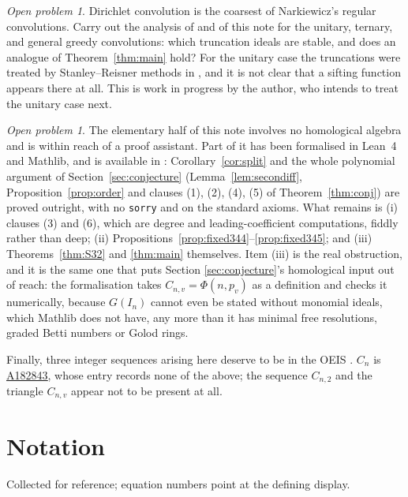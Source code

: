 \documentclass[a4paper,11pt,oneside,reqno]{amsart}
\theoremstyle{definition}
\theoremstyle{remark}
\newtheorem{openproblem}[definition]{Open problem}
\theoremstyle{plain}
\newcommand{\seqnum}[1]{\href{https://oeis.org/#1}{\underline{#1}}}
\begin{document}
\begin{openproblem}
  Dirichlet convolution is the coarsest of Narkiewicz's regular convolutions.
  Carry out the analysis of \cite{Snellman2000} and of this note for the
  unitary, ternary, and general greedy convolutions: which truncation ideals are
  stable, and does an analogue of Theorem~\ref{thm:main} hold? For the unitary
  case the truncations were treated by Stanley--Reisner methods in
  \cite{SnellmanUnitaryGeneral,SnellmanUnitaryN}, and it is not clear that a
  sifting function
  appears there at all. This is work in progress by the author, who intends to
  treat the unitary case next.
\end{openproblem}

\begin{openproblem}\label{op:lean}
  The elementary half of this note involves no homological algebra and is
  within reach of a proof assistant. Part of it has been formalised in Lean~4
  and Mathlib, and is available in \cite{gitrepo}: Corollary~\ref{cor:split}
  and the whole polynomial argument of Section~\ref{sec:conjecture}
  (Lemma~\ref{lem:secondiff}, Proposition~\ref{prop:order} and clauses
  (1), (2), (4), (5) of Theorem~\ref{thm:conj}) are proved outright, with no
  \texttt{sorry} and on the standard axioms. What remains is (i) clauses (3)
  and (6), which are degree and leading-coefficient computations, fiddly rather
  than deep; (ii) Propositions~\ref{prop:fixed344}--\ref{prop:fixed345}; and
  (iii) Theorems~\ref{thm:S32} and \ref{thm:main} themselves. Item (iii) is the
  real obstruction, and it is the same one that puts Section
  \ref{sec:conjecture}'s homological input out of reach: the formalisation
  takes \(C_{n,v} = \Phi(n,p_v)\) as a definition and checks it numerically,
  because \(G(I_n)\) cannot even be stated without monomial ideals, which
  Mathlib does not have, any more than it has minimal free resolutions,
  graded Betti numbers or Golod rings.
\end{openproblem}

Finally, three integer sequences arising here deserve to be in the OEIS \cite{OEIS}.
\(C_n\) is \seqnum{A182843}, whose entry records none of the above; the
sequence \(C_{n,2}\) and the triangle \(C_{n,v}\) appear not to be present at
all.

\section*{Notation}

Collected for reference; equation numbers point at the defining display.
\end{document}
